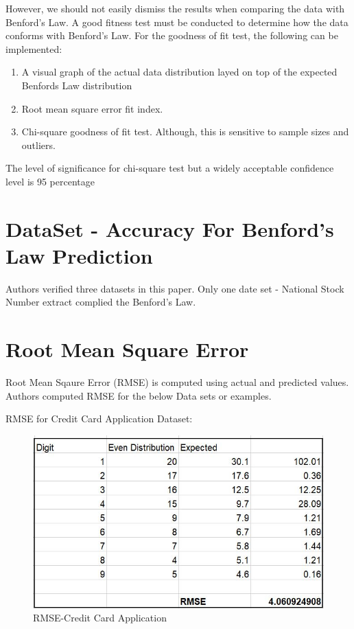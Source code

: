 However, we should not easily dismiss the results 
when comparing the data with Benford’s Law. 
A good fitness test must be conducted to determine 
how the data conforms with Benford’s Law.
For the goodness of fit test, the following can be implemented:

\begin{enumerate}
\item A visual graph of the actual data distribution 
layed on top of the expected Benfords Law distribution
\item Root mean square error fit index.
\item Chi-square goodness of fit test. Although, 
this is sensitive to sample sizes and outliers.
\end{enumerate}

The level of significance for chi-square test 
but a widely acceptable confidence level is 95 percentage

\section{DataSet - Accuracy For Benford's Law Prediction}
Authors verified three datasets in this paper. Only one
date set - National Stock Number extract 
complied the Benford's Law.

\section{Root Mean Square Error}
Root Mean Sqaure Error (RMSE) is computed 
using actual and predicted values.
Authors computed RMSE for the below Data sets or examples.

RMSE for Credit Card Application Dataset:
\begin{figure}[!ht]
\centering\includegraphics[width=\columnwidth]{images/rmse_cc_app.JPG}
  \caption{RMSE-Credit Card Application}\label{f:rmse-cc-app}
\end{figure}

